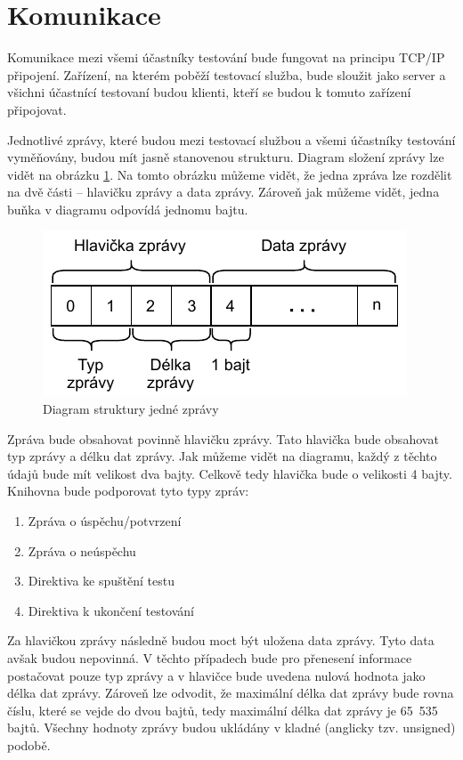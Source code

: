 \section{Komunikace}
Komunikace mezi všemi účastníky testování bude fungovat na principu TCP/IP připojení. Zařízení, na kterém poběží testovací služba, bude sloužit jako server a všichni účastnící testovaní budou klienti, kteří se budou k tomuto zařízení připojovat. 

Jednotlivé zprávy, které budou mezi testovací službou a všemi účastníky testování vyměňovány, budou mít jasně stanovenou strukturu. Diagram složení zprávy lze vidět na obrázku \ref{fig:message}. Na tomto obrázku můžeme vidět, že jedna zpráva lze rozdělit na dvě části -- hlavičku zprávy a data zprávy. Zároveň jak můžeme vidět, jedna buňka v diagramu odpovídá jednomu bajtu. 

\begin{figure}[htbp]
    \centering 
    \includegraphics{assets/img/message.pdf}
    \caption{Diagram struktury jedné zprávy}
    \label{fig:message}
\end{figure}

Zpráva bude obsahovat povinně hlavičku zprávy. Tato hlavička bude obsahovat typ zprávy a délku dat zprávy. Jak můžeme vidět na diagramu, každý z těchto údajů bude mít velikost dva bajty. Celkově tedy hlavička bude o velikosti 4 bajty. Knihovna bude podporovat tyto typy zpráv:

\begin{enumerate}
    \item Zpráva o úspěchu/potvrzení
    \item Zpráva o neúspěchu
    \item Direktiva ke spuštění testu
    \item Direktiva k ukončení testování
\end{enumerate}

Za hlavičkou zprávy následně budou moct být uložena data zprávy. Tyto data avšak budou nepovinná. V těchto případech bude pro přenesení informace postačovat pouze typ zprávy a v hlavičce bude uvedena nulová hodnota jako délka dat zprávy. Zároveň lze odvodit, že maximální délka dat zprávy bude rovna číslu, které se vejde do dvou bajtů, tedy maximální délka dat zprávy je 65~535 bajtů. Všechny hodnoty zprávy budou ukládány v kladné (anglicky tzv. unsigned) podobě.

